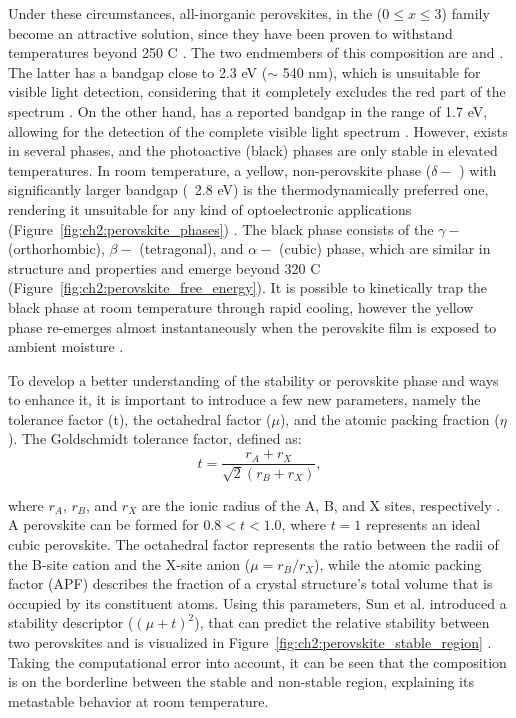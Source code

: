 Under these circumstances, all-inorganic perovskites, in the  ($0 \le x \le 3$) family become an attractive solution, since they have been proven to withstand temperatures beyond 250 \degree C \cite{Dong2021High-TemperatureCells}. The two endmembers of this composition are  and . The latter has a bandgap close to 2.3 eV ($\sim$ 540 nm), which is unsuitable for visible light detection, considering that it completely excludes the red part of the spectrum \cite{Tong2020RecentCells}. On the other hand,  has a reported bandgap in the range of 1.7 eV, allowing for the detection of the complete visible light spectrum \cite{Zhao2018ThermodynamicallyPhotovoltaics}. However,  exists in several phases, and the photoactive (black) phases are only stable in elevated temperatures. In room temperature, a yellow, non-perovskite phase ($\delta-$ ) with significantly larger bandgap (~2.8 eV) is the thermodynamically preferred one, rendering it unsuitable for any kind of optoelectronic applications (Figure~\ref{fig:ch2:perovskite_phases}) \cite{Cho2021Long-termNetwork, Burwig2018CrystalFilms, Steele2022AnFilms}. The black phase consists of the $\gamma-$ (orthorhombic), $\beta-$ (tetragonal), and $\alpha-$ (cubic) phase, which are similar in structure and properties and emerge beyond 320 \degree C (Figure~\ref{fig:ch2:perovskite_free_energy}). It is possible to kinetically trap the black phase at room temperature through rapid cooling, however the yellow phase re-emerges almost instantaneously when the perovskite film is exposed to ambient moisture \cite{Steele2019ThermalFilms}. 

To develop a better understanding of the stability or perovskite phase and ways to enhance it, it is important to introduce a few new parameters, namely the tolerance factor (t), the octahedral factor ($\mu$), and the atomic packing fraction ($\eta$). The Goldschmidt tolerance factor, defined as:
\begin{equation}
    t = \frac{r_A + r_X}{\sqrt{2}(r_B + r_X)},
    \label{eq:tolerance_factor}
\end{equation} 

where $r_A$, $r_B$, and $r_X$ are the ionic radius of the A, B, and X sites, respectively \cite{Goldschmidt1926DieKrystallochemie}. A perovskite can be formed for $0.8 < t < 1.0$, where $t = 1$ represents an ideal cubic perovskite. The octahedral factor represents the ratio between the radii of the B-site cation and the X-site anion ($\mu = r_B/r_X$), while the atomic packing factor (APF) describes the fraction of a crystal structure's total volume that is occupied by its constituent atoms. Using this parameters, Sun et al. introduced a stability descriptor ($(\mu + t)^2$), that can predict the relative stability between two perovskites and is visualized in Figure~\ref{fig:ch2:perovskite_stable_region} \cite{Sun2017ThermodynamicPerovskites}. Taking the computational error into account, it can be seen that the  composition is on the borderline between the stable and non-stable region, explaining its metastable behavior at room temperature.  

